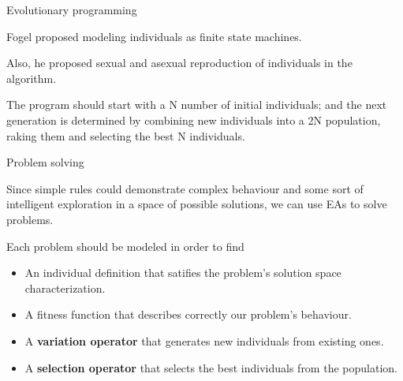   \begin{frame}{Evolutionary programming}
  \begin{blur}
    Fogel proposed modeling individuals as finite state machines.

    Also, he proposed sexual and asexual reproduction of individuals
    in the algorithm.

    The program should start with a N number of initial individuals;
    and the next generation is determined by combining new individuals
    into a 2N population, raking them and selecting the best N
    individuals.
  \end{blur}
  \end{frame}

  \begin{frame}{Problem solving}
  \begin{blur}
     {
        Since simple rules could demonstrate complex behaviour and some
        sort of intelligent exploration in a space of possible solutions,
        we can use EAs to solve problems.
    }

     {
      Each problem should be modeled in order to find
      \begin{itemize}
        \item An individual definition that satifies the problem's
        solution space characterization.
        \item A fitness function that describes correctly our problem's
        behaviour.
        \item A \textbf{variation operator} that generates new
        individuals from existing ones.
        \item A \textbf{selection operator} that selects the best
        individuals from the population.
      \end{itemize}
    }
  \end{blur}
  \end{frame}

